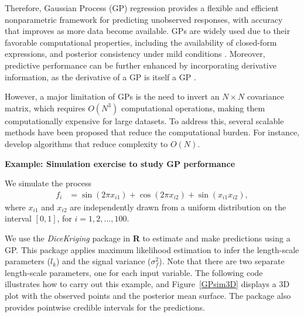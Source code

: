 Therefore, Gaussian Process (GP) regression provides a flexible and efficient nonparametric framework for predicting unobserved responses, with accuracy that improves as more data become available. GPs are widely used due to their favorable computational properties, including the availability of closed-form expressions, and posterior consistency under mild conditions \cite{choi2007posterior, stuart2018posterior}. Moreover, predictive performance can be further enhanced by incorporating derivative information, as the derivative of a GP is itself a GP \cite{solak2003derivative,jacobi2024posterior}. 

However, a major limitation of GPs is the need to invert an \( N \times N \) covariance matrix, which requires \( O(N^3) \) computational operations, making them computationally expensive for large datasets. To address this, several scalable methods have been proposed that reduce the computational burden. For instance, \cite{wilson2015kernel,gardner2018product, pleiss2018constant} develop algorithms that reduce complexity to \( O(N) \).

\textbf{Example: Simulation exercise to study GP performance}

We simulate the process
\begin{align*}
	f_i & = \sin(2\pi x_{i1}) + \cos(2\pi x_{i2}) + \sin(x_{i1} x_{i2}),
\end{align*}
where $x_{i1}$ and $x_{i2}$ are independently drawn from a uniform distribution on the interval $[0, 1]$, for $i = 1, 2, \dots, 100$.

We use the \textit{DiceKriging} package in \textbf{R} to estimate and make predictions using a GP. This package applies maximum likelihood estimation to infer the length-scale parameters ($l_k$) and the signal variance ($\sigma_f^2$). Note that there are two separate length-scale parameters, one for each input variable. The following code illustrates how to carry out this example, and Figure~\ref{GPsim3D} displays a 3D plot with the observed points and the posterior mean surface. The package also provides pointwise credible intervals for the predictions.

